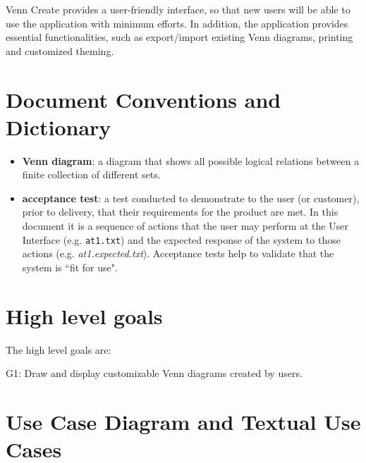 \documentclass[fontsize=12pt,paper=letter,twoside]{scrartcl}
\begin{document}
Venn Create provides a user-friendly interface, so that new users will
be able to use the application with minimum efforts. In addition,
the application provides essential functionalities, such as export/import
existing Venn diagrams, printing and customized theming.
 

\newpage
\section{Document Conventions and Dictionary}

\begin{itemize}
	\item \textbf{Venn diagram}: a diagram that shows all possible logical relations between a finite collection of different sets. 
	\item \textbf{acceptance test}: a test conducted to demonstrate to the user (or customer), prior to delivery, that their requirements for the product are met. In this document it is a sequence of actions that the user may perform at the User Interface (e.g. \texttt{at1.txt}) and the expected response  of the system to those actions (e.g. \textit{at1.expected.txt}). Acceptance tests help to validate that the system is ``fit for use".
\end{itemize}

\newpage
\section{High level goals}
The high level goals are:

\begin{description}
	\item[G1: Draw and display customizable Venn diagrams created by users.]
\end{description}

\newpage
\section{Use Case Diagram and Textual Use Cases}
\end{document}
